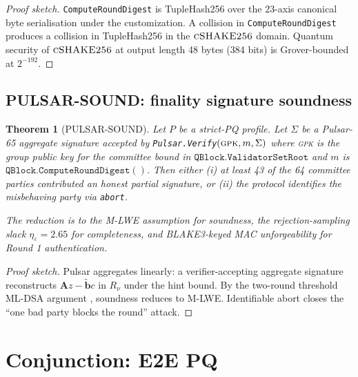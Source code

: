 \documentclass[11pt,a4paper]{article}
\newtheorem{theorem}{Theorem}
\begin{document}
\begin{proof}[Proof sketch]
\texttt{ComputeRoundDigest} is TupleHash256 over the 23-axis canonical
byte serialisation under the customization. A collision in
\texttt{ComputeRoundDigest} produces a collision in TupleHash256 in the
$\textsc{cSHAKE256}$ domain. Quantum security of $\textsc{cSHAKE256}$ at
output length 48 bytes (384 bits) is Grover-bounded at $2^{-192}$.
\end{proof}

\subsection{PULSAR-SOUND: finality signature soundness}

\begin{theorem}[PULSAR-SOUND]
\label{thm:pulsar-sound}
Let $P$ be a strict-PQ profile. Let $\Sigma$ be a Pulsar-65 aggregate
signature accepted by \texttt{Pulsar.Verify}$(\textsc{gpk}, m, \Sigma)$
where \textsc{gpk} is the group public key for the committee bound in
$\texttt{QBlock.ValidatorSetRoot}$ and $m$ is
$\texttt{QBlock.ComputeRoundDigest}()$. Then either (i) at least 43 of
the 64 committee parties contributed an honest partial signature, or
(ii) the protocol identifies the misbehaving party via
\texttt{abort}\cite{lp073}.

The reduction is to the M-LWE assumption \cite{mlwe,regev2009} for
soundness, the rejection-sampling slack
$\eta_\varepsilon = 2.65$ for completeness, and BLAKE3-keyed MAC
unforgeability for Round 1 authentication.
\end{theorem}

\begin{proof}[Proof sketch]
Pulsar aggregates linearly: a verifier-accepting aggregate signature
reconstructs $\mathbf{A} z - \tilde{\mathbf{b}} c$ in $R_\nu$ under the
hint bound. By the two-round threshold ML-DSA argument
\cite{dttf2024,thresholdraccoon}, soundness reduces to M-LWE.
Identifiable abort \cite{lp073,boschini2024ringtail} closes the ``one bad
party blocks the round'' attack.
\end{proof}

\section{Conjunction: E2E PQ}
\end{document}
